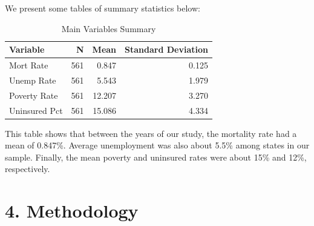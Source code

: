 \documentclass[
]{article}
\begin{document}
We present some tables of summary statistics below:

\begin{table}[H]

\caption{\label{tab:tab:replicatetable2a}Main Variables Summary}
\centering
\begin{tabular}[t]{lrrr}
\toprule
Variable & N & Mean & Standard Deviation\\
\midrule
Mort Rate & 561 & 0.847 & 0.125\\
Unemp Rate & 561 & 5.543 & 1.979\\
Poverty Rate & 561 & 12.207 & 3.270\\
Uninsured Pct & 561 & 15.086 & 4.334\\
\bottomrule
\end{tabular}
\end{table}

This table shows that between the years of our study, the mortality rate
had a mean of 0.847\%. Average unemployment was also about 5.5\% among
states in our sample. Finally, the mean poverty and uninsured rates were
about 15\% and 12\%, respectively.

\hypertarget{methodology}{%
\section{4. Methodology}\label{methodology}}
\end{document}

